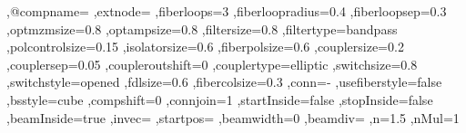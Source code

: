 {        ,@compname=\@empty
        ,extnode=\@empty
        ,fiberloops=3
        ,fiberloopradius=0.4
        ,fiberloopsep=0.3
        ,optmzmsize=0.8
        ,optampsize=0.8
        ,filtersize=0.8
        ,filtertype=bandpass
        ,polcontrolsize=0.15
        ,isolatorsize=0.6
        ,fiberpolsize=0.6
        ,couplersize=0.2
        ,couplersep=0.05
        ,coupleroutshift=0
        ,couplertype=elliptic
        ,switchsize=0.8
        ,switchstyle=opened
        ,fdlsize=0.6
        ,fibercolsize=0.3
        ,conn=-
        ,usefiberstyle=false
        ,bsstyle=cube
        ,compshift=0
        ,connjoin=1
        ,startInside=false
        ,stopInside=false
        ,beamInside=true
        ,invec=\@empty
        ,startpos=\@empty
        ,beamwidth=0
        ,beamdiv=\@empty
        ,n=1.5
        ,nMul=1
}%
%
%
%
\def\pst@draw@component#1#2{%
    \def\@@comp{%
       #2
       \ifx\POK@extnode\@empty\else
          \pnode(! \pst@optexpdict ExtNode end){\POK@extnode@name}
       \fi
    }%
    \ifPOE@endbox%
       \ifx\POK@label@offset\@empty
          \psset{labeloffset=0}
       \fi
       \psset{position=1}%
    \fi%
    \ncline[linestyle=none,fillstyle=none,npos=]{\optexp@nodeA}{\optexp@nodeB}%
    \begingroup
    \psset{style=OptComp}
    \ifPOE@component@optional
      \psset{style=OptionalStyle}%
    \fi
    \ifx\POK@position\@empty
        \ifx\POK@abspos\@empty
           \ncput[nrot=:U,npos=]{\put@Comp{\@@comp}}
        \else
           \nlput[nrot=:U](\optexp@nodeA)(\optexp@nodeB){\POK@abspos}{\put@Comp{\@@comp}}
        \fi
    \else
       \ncput[nrot=:U,npos=\POK@position]{\put@Comp{\@@comp}}
    \fi
    \endgroup
    \ifPOE@label@innerlabel
       \ifdim\optboxwidth>0pt
          \psset{labeloffset=0, labelref=relative}
          \put@Label{\parbox{\optboxwidth}{#1}}%
       \else
          \put@Label{#1}%
       \fi
    \else
       \put@Label{#1}%
    \fi
    \ifPOE@debug@showoptdots
        \psdot[linecolor=red](\optexp@nodeLabel)
        \psdot[linecolor=red](\optexp@nodeLabelShifted)
        \psdot[linecolor=black](\optexp@nodeA)
        \psdot[linecolor=black](\optexp@nodeB)
    \fi
\ignorespaces}%
